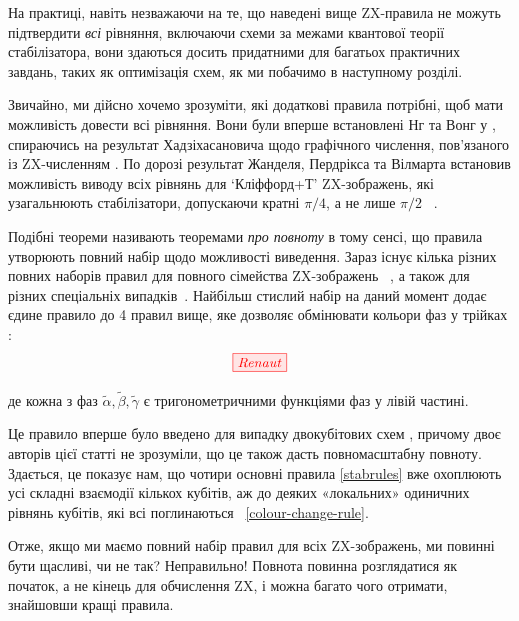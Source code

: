 \documentclass[11pt]{article}
\theoremstyle{definition}
\newcommand{\beq}{\begin{equation}}
\newcommand{\eeq}{\end{equation}\par\noindent}
\begin{document}
{%


На практиці, навіть незважаючи на те, що наведені вище ZX-правила не можуть підтвердити \textit{всі} рівняння, включаючи схеми за межами квантової теорії стабілізатора, вони здаються досить придатними для багатьох практичних завдань, таких як оптимізація схем, як ми побачимо в наступному розділі. %

Звичайно, ми дійсно хочемо зрозуміти, які додаткові правила потрібні, щоб мати можливість довести всі рівняння. Вони були вперше встановлені Нг та Вонг у \cite{ng2017universal}, спираючись на результат Хадзіхасановича щодо графічного числення, пов’язаного із ZX-численням \cite{hadzihasanovic2017algebra, hadzihasanovic2018two}. По дорозі результат Жанделя, Пердрікса та Вілмарта встановив можливість виводу всіх рівнянь для `Кліффорд+Т' ZX-зображень, які узагальнюють стабілізатори, допускаючи кратні $\pi/4$, а не лише $\pi/2$ ~\cite{jeandel2018complete}.

Подібні теореми називають теоремами \textit{про повноту} в тому сенсі, що правила утворюють повний набір щодо можливості виведення. Зараз існує кілька різних повних наборів правил для повного сімейства ZX-зображень ~\cite{ng2017universal,vilmart2019near}, а також для різних спеціальніх випадків~\cite{jpvnormalform,jeandel2018complete,jeandel2018diagrammatic,zxtri}. Найбільш стислий набір на даний момент додає єдине правило до 4 правил вище, яке дозволяє обмінювати кольори фаз у трійках \cite{vilmart2019near}:
\beq\label{colour-change-rule} 
\tikzfig{Renaut} 
\eeq
де кожна з фаз $\tilde\alpha, \tilde\beta, \tilde\gamma$ є тригонометричними функціями фаз у лівій частині.

Це правило вперше було введено для випадку двокубітових схем \cite{DBLP:conf/rc/CoeckeW18}, причому двоє авторів цієї статті не зрозуміли, що це також дасть повномасштабну повноту. Здається, це показує нам, що чотири основні правила \eqref{stabrules} вже охоплюють усі складні взаємодії кількох кубітів, аж до деяких «локальних» одиничних рівнянь кубітів, які всі поглинаються ~\eqref{colour-change-rule}.

Отже, якщо ми маємо повний набір правил для всіх ZX-зображень, ми повинні бути щасливі, чи не так? Неправильно! Повнота повинна розглядатися як початок, а не кінець для обчислення ZX, і можна багато чого отримати, знайшовши кращі правила.
 
}
\end{document}

